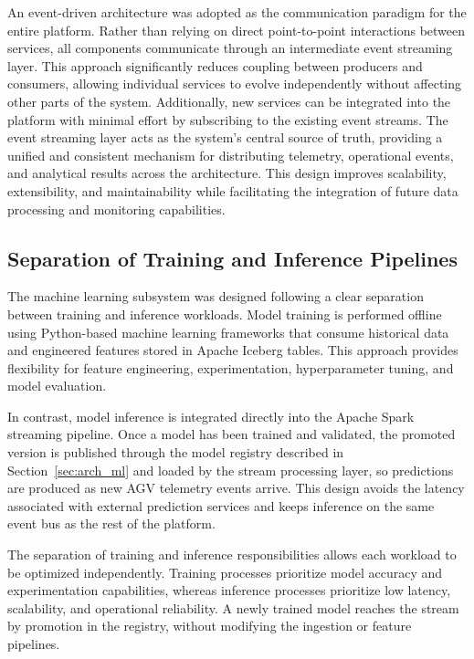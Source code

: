 An event-driven architecture was adopted as the communication paradigm for the entire platform.
Rather than relying on direct point-to-point interactions between services, all components communicate through an intermediate event streaming layer.
This approach significantly reduces coupling between producers and consumers, allowing individual services to evolve independently without affecting other parts of the system.
Additionally, new services can be integrated into the platform with minimal effort by subscribing to the existing event streams.
The event streaming layer acts as the system's central source of truth, providing a unified and consistent mechanism for distributing telemetry, operational events, and analytical results across the architecture.
This design improves scalability, extensibility, and maintainability while facilitating the integration of future data processing and monitoring capabilities.

\subsection{Separation of Training and Inference Pipelines}

The machine learning subsystem was designed following a clear separation between training and inference workloads.
Model training is performed offline using Python-based machine learning frameworks that consume historical data and engineered features stored in Apache Iceberg tables.
This approach provides flexibility for feature engineering, experimentation, hyperparameter tuning, and model evaluation.

In contrast, model inference is integrated directly into the Apache Spark streaming pipeline.
Once a model has been trained and validated, the promoted version is published through the model registry described in Section~\ref{sec:arch_ml} and loaded by the stream processing layer, so predictions are produced as new AGV telemetry events arrive.
This design avoids the latency associated with external prediction services and keeps inference on the same event bus as the rest of the platform.

The separation of training and inference responsibilities allows each workload to be optimized independently.
Training processes prioritize model accuracy and experimentation capabilities, whereas inference processes prioritize low latency, scalability, and operational reliability.
A newly trained model reaches the stream by promotion in the registry, without modifying the ingestion or feature pipelines.

